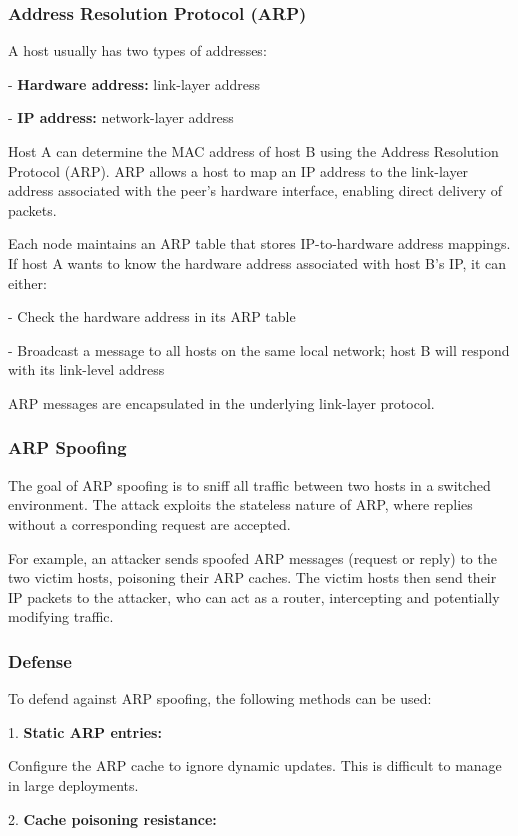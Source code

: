 \subsubsection{Address Resolution Protocol (ARP)}
A host usually has two types of addresses:

- \textbf{Hardware address:} link-layer address 

- \textbf{IP address:} network-layer address  

Host A can determine the MAC address of host B using the Address Resolution Protocol (ARP). ARP allows a host to map an IP address to the link-layer address associated with the peer's hardware interface, enabling direct delivery of packets. 

Each node maintains an ARP table that stores IP-to-hardware address mappings. If host A wants to know the hardware address associated with host B's IP, it can either:

- Check the hardware address in its ARP table  

- Broadcast a message to all hosts on the same local network; host B will respond with its link-level address  

ARP messages are encapsulated in the underlying link-layer protocol.  

\subsubsection{ARP Spoofing}
The goal of ARP spoofing is to sniff all traffic between two hosts in a switched environment. The attack exploits the stateless nature of ARP, where replies without a corresponding request are accepted. 

For example, an attacker sends spoofed ARP messages (request or reply) to the two victim hosts, poisoning their ARP caches. The victim hosts then send their IP packets to the attacker, who can act as a router, intercepting and potentially modifying traffic.  

\subsubsection{Defense}
To defend against ARP spoofing, the following methods can be used:

1. \textbf{Static ARP entries:}  

Configure the ARP cache to ignore dynamic updates. This is difficult to manage in large deployments.  

2. \textbf{Cache poisoning resistance:}  

